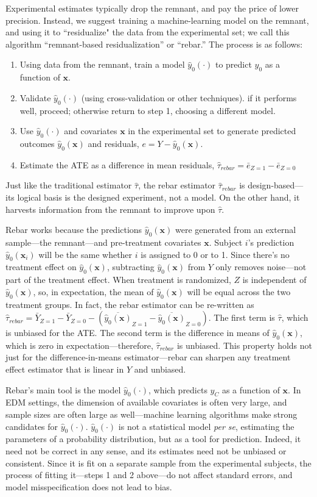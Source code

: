 \documentclass{edm_template}
\newcommand{\tauhat}{\hat{\tau}}
\newcommand{\rebar}{\hat{\tau}_{rebar}}
\newcommand{\model}{\hat{y}_0(\cdot)}
\newcommand{\pred}{\hat{y}_0(\bm{x})}
\newcommand{\predi}{\hat{y}_0(\bm{x}_i)}
\begin{document}
Experimental estimates typically drop the remnant, and pay the price of lower precision. 
Instead, we suggest training a machine-learning model on the remnant, and using it to ``residualize" the data from the experimental set; we call this algorithm ``remnant-based residualization'' or ``rebar.''
The process is as follows:
\begin{enumerate}
 \item Using data from the remnant, train a model $\model$ to predict $y_0$ as a function of $\bm{x}$.
 \item Validate $\model$ (using cross-validation or other techniques). if it performs well, proceed; otherwise return to step 1, choosing a different model.
 \item Use $\model$ and covariates $\bm{x}$ in the experimental set to generate predicted outcomes $\pred$ and residuals, $e=Y-\pred$.
 \item Estimate the ATE as a difference in mean residuals, $\rebar=\bar{e}_{Z=1}-\bar{e}_{Z=0}$
\end{enumerate}
Just like the traditional estimator $\tauhat$, the rebar estimator $\rebar$ is design-based---its logical basis is the designed experiment, not a model. 
On the other hand, it harvests information from the remnant to improve upon $\tauhat$.

Rebar works because the predictions $\pred$ were generated from an external sample---the remnant---and pre-treatment covariates $\bm{x}$.
Subject $i$'s prediction $\predi$ will be the same whether $i$ is assigned to 0 or to 1.
Since there's no treatment effect on $\pred$, subtracting $\pred$ from $Y$ only removes noise---not part of the treatment effect. 
When treatment is randomized, $Z$ is independent of $\pred$, so, in expectation, the mean of $\pred$ will be equal across the two treatment groups.
  In fact, the rebar estimator can be re-written as $\rebar=\bar{Y}_{Z=1}-\bar{Y}_{Z=0}-(\overline{\pred}_{Z=1}-\overline{\pred}_{Z=0})$. 
The first term is $\tauhat$, which is unbiased for the ATE. The second term is the difference in means of $\pred$, which is zero in expectation---therefore, $\rebar$ is unbiased. 
This property holds not just for the difference-in-means estimator---rebar can sharpen any treatment effect estimator that is linear in $Y$ and unbiased.

Rebar's main tool is the model $\model$, which predicts $y_C$ as a function of $\bm{x}$. 
In EDM settings, the dimension of available covariates is often very large, and sample sizes are often large as well---machine learning algorithms make strong candidates for $\model$.
$\model$ is not a statistical model \emph{per se}, estimating the parameters of a probability distribution, but as a tool for prediction.
Indeed, it need not be correct in any sense, and its estimates need not be unbiased or consistent. 
Since it is fit on a separate sample from the experimental subjects, the process of fitting it---steps 1 and 2 above---do not affect standard errors, and model misspecification does not lead to bias.
\end{document}
